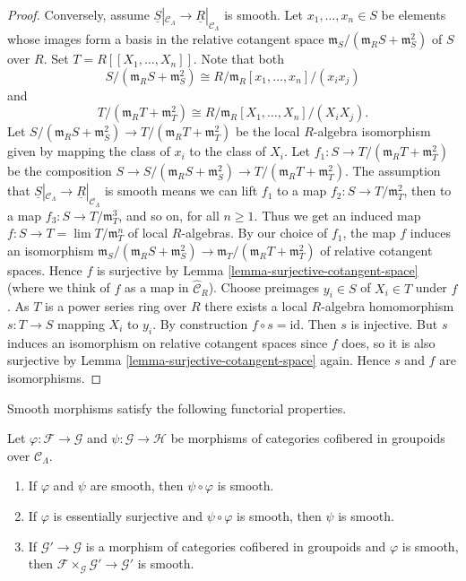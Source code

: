 \begin{proof}
\medskip\noindent
Conversely, assume
$\underline{S}|_{\mathcal{C}_\Lambda} \to \underline{R}|_{\mathcal{C}_\Lambda}$
is smooth. Let $x_1, \ldots, x_n \in S$ be elements whose images
form a basis in the relative cotangent space
$\mathfrak m_S/(\mathfrak m_R S + \mathfrak m_S^2)$ of $S$ over $R$.
Set $T = R[[X_1, \ldots, X_n]]$. Note that both
$$
S/(\mathfrak m_R S + \mathfrak m_S^2) \cong
R/\mathfrak m_R[x_1, \ldots, x_n]/(x_ix_j)
$$
and
$$
T/(\mathfrak m_R T + \mathfrak m_T^2) \cong
R/\mathfrak m_R[X_1, \ldots, X_n]/(X_iX_j).
$$
Let
$S/(\mathfrak m_R S + \mathfrak m_S^2) \to
T/(\mathfrak m_R T + \mathfrak m_T^2)$
be the local $R$-algebra isomorphism given by mapping
the class of $x_i$ to the class of $X_i$. Let
$f_1 : S \to T/(\mathfrak m_R T + \mathfrak m_T^2)$ be the
composition
$S \to S/(\mathfrak m_R S + \mathfrak m_S^2)
\to T/(\mathfrak m_R T + \mathfrak m_T^2)$.
The assumption that
$\underline{S}|_{\mathcal{C}_\Lambda} \to \underline{R}|_{\mathcal{C}_\Lambda}$
is smooth means we can lift $f_1$ to a map
$f_2 : S \to T/\mathfrak{m}_T^2$, then to a map
$f_3 : S \to T/\mathfrak{m}_T^3$, and so on, for all $n \geq 1$. Thus
we get an induced map $f : S \to T = \lim T/\mathfrak m_T^n$
of local $R$-algebras. By our choice of $f_1$, the map $f$ induces an
isomorphism
$\mathfrak m_S/(\mathfrak m_R S + \mathfrak m_S^2) \to
\mathfrak m_T/(\mathfrak m_R T + \mathfrak m_T^2)$
of relative cotangent spaces.
Hence $f$ is surjective by
Lemma \ref{lemma-surjective-cotangent-space}
(where we think of $f$ as a map in $\widehat{\mathcal{C}}_R$).
Choose preimages $y_i \in S$ of $X_i \in T$ under $f$. As $T$ is a
power series ring over $R$ there exists a local
$R$-algebra homomorphism $s : T \to S$ mapping $X_i$ to $y_i$.
By construction $f \circ s = \text{id}$. Then $s$ is injective.
But $s$ induces an isomorphism on relative cotangent spaces since
$f$ does, so it is also surjective by
Lemma \ref{lemma-surjective-cotangent-space}
again. Hence $s$ and $f$ are isomorphisms.
\end{proof}

\noindent
Smooth morphisms satisfy the following functorial properties.

\begin{lemma}
\label{lemma-smooth-properties}
Let $\varphi : \mathcal{F} \to \mathcal{G}$ and $\psi : \mathcal{G}
\to \mathcal{H}$ be morphisms of categories cofibered in groupoids over
$\mathcal{C}_\Lambda$.
\begin{enumerate}
\item If $\varphi$ and $\psi$ are smooth, then $\psi \circ \varphi$ is smooth.
\item If $\varphi$ is essentially surjective and $\psi \circ \varphi$ is
smooth, then $\psi$ is smooth.
\item If $\mathcal{G}' \to \mathcal{G}$ is a morphism of categories
cofibered in groupoids and $\varphi$ is smooth, then
$\mathcal{F} \times_\mathcal{G} \mathcal{G}' \to \mathcal{G}'$ is smooth.
\end{enumerate}
\end{lemma}

